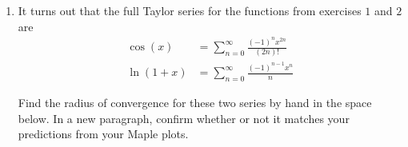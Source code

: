 \begin{enumerate}
\item It turns out that the full Taylor series for the functions from exercises $1$ and $2$ are
\begin{align*}
\cos(x)&=\sum_{n=0}^{\infty} \frac{(-1)^n x^{2n}}{(2n)!} \\
\ln(1+x)&=\sum_{n=0}^{\infty} \frac{(-1)^{n-1} x^n}{n}
\end{align*}

Find the radius of convergence for these two series by hand in the space below. In a new paragraph, confirm whether or not it matches your predictions from your Maple plots.

\begin{fullwidth}
\end{fullwidth}

\end{enumerate}